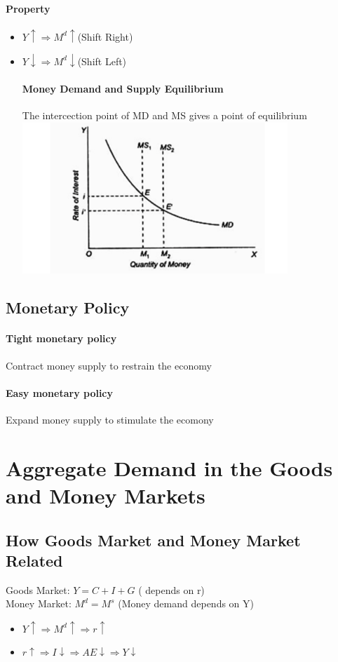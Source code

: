 \documentclass[11pt]{article}
\begin{document}
\paragraph{Property}
\begin{itemize}
    \item $Y\uparrow \Rightarrow M^d \uparrow$(Shift Right)
    \item $Y\downarrow \Rightarrow M^d \downarrow$(Shift Left)
\paragraph{Money Demand and Supply Equilibrium}
The intercection point of MD and MS gives a point of equilibrium\\
\includegraphics[width=10cm]{equilibrium.png}
\end{itemize}

\subsection{Monetary Policy}
\paragraph{Tight monetary policy}
Contract money supply to restrain the economy
\paragraph{Easy monetary policy}
Expand money supply to stimulate the ecomony

\section{Aggregate Demand in the Goods and Money Markets}
\subsection{How Goods Market and Money Market Related}
Goods Market: $Y = C + I + G$ ( depends on r)\\
Money Market: $M^d = M^s$ (Money demand depends on Y)
\begin{itemize}
    \item $Y\uparrow \Rightarrow M^d\uparrow \Rightarrow r\uparrow$
    \item $r\uparrow \Rightarrow I\downarrow \Rightarrow AE\downarrow \Rightarrow Y\downarrow$
\end{itemize}
\end{document}
